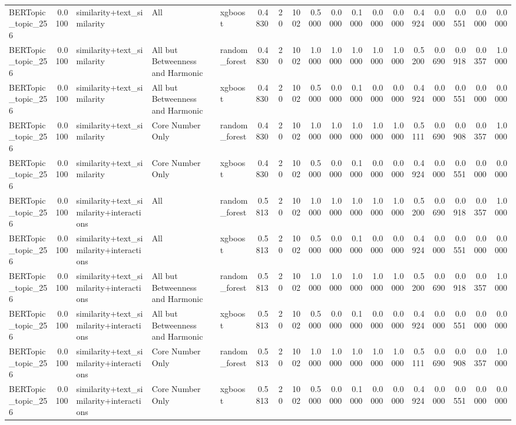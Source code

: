 \begin{tabular}{lrlllrrrrrrrrrrrrr}
BERTopic_topic_256 & 0.0100 & similarity+text_similarity & All & xgboost & 0.4830 & 20 & 1002 & 0.5000 & 0.0000 & 0.1000 & 0.0000 & 0.0000 & 0.4924 & 0.0000 & 0.0551 & 0.0000 & 0.0000 \\
BERTopic_topic_256 & 0.0100 & similarity+text_similarity & All but Betweenness and Harmonic & random_forest & 0.4830 & 20 & 1002 & 1.0000 & 1.0000 & 1.0000 & 1.0000 & 1.0000 & 0.5200 & 0.0690 & 0.0918 & 0.0357 & 1.0000 \\
BERTopic_topic_256 & 0.0100 & similarity+text_similarity & All but Betweenness and Harmonic & xgboost & 0.4830 & 20 & 1002 & 0.5000 & 0.0000 & 0.1000 & 0.0000 & 0.0000 & 0.4924 & 0.0000 & 0.0551 & 0.0000 & 0.0000 \\
BERTopic_topic_256 & 0.0100 & similarity+text_similarity & Core Number Only & random_forest & 0.4830 & 20 & 1002 & 1.0000 & 1.0000 & 1.0000 & 1.0000 & 1.0000 & 0.5111 & 0.0690 & 0.0908 & 0.0357 & 1.0000 \\
BERTopic_topic_256 & 0.0100 & similarity+text_similarity & Core Number Only & xgboost & 0.4830 & 20 & 1002 & 0.5000 & 0.0000 & 0.1000 & 0.0000 & 0.0000 & 0.4924 & 0.0000 & 0.0551 & 0.0000 & 0.0000 \\
BERTopic_topic_256 & 0.0100 & similarity+text_similarity+interactions & All & random_forest & 0.5813 & 20 & 1002 & 1.0000 & 1.0000 & 1.0000 & 1.0000 & 1.0000 & 0.5200 & 0.0690 & 0.0918 & 0.0357 & 1.0000 \\
BERTopic_topic_256 & 0.0100 & similarity+text_similarity+interactions & All & xgboost & 0.5813 & 20 & 1002 & 0.5000 & 0.0000 & 0.1000 & 0.0000 & 0.0000 & 0.4924 & 0.0000 & 0.0551 & 0.0000 & 0.0000 \\
BERTopic_topic_256 & 0.0100 & similarity+text_similarity+interactions & All but Betweenness and Harmonic & random_forest & 0.5813 & 20 & 1002 & 1.0000 & 1.0000 & 1.0000 & 1.0000 & 1.0000 & 0.5200 & 0.0690 & 0.0918 & 0.0357 & 1.0000 \\
BERTopic_topic_256 & 0.0100 & similarity+text_similarity+interactions & All but Betweenness and Harmonic & xgboost & 0.5813 & 20 & 1002 & 0.5000 & 0.0000 & 0.1000 & 0.0000 & 0.0000 & 0.4924 & 0.0000 & 0.0551 & 0.0000 & 0.0000 \\
BERTopic_topic_256 & 0.0100 & similarity+text_similarity+interactions & Core Number Only & random_forest & 0.5813 & 20 & 1002 & 1.0000 & 1.0000 & 1.0000 & 1.0000 & 1.0000 & 0.5111 & 0.0690 & 0.0908 & 0.0357 & 1.0000 \\
BERTopic_topic_256 & 0.0100 & similarity+text_similarity+interactions & Core Number Only & xgboost & 0.5813 & 20 & 1002 & 0.5000 & 0.0000 & 0.1000 & 0.0000 & 0.0000 & 0.4924 & 0.0000 & 0.0551 & 0.0000 & 0.0000 \\

\end{tabular}
